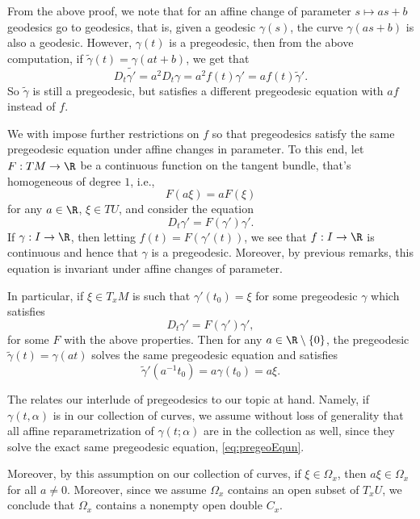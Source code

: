 From the above proof, we note that for an affine change of parameter $s\mapsto as+b$ geodesics go to geodesics, that is, given a geodesic $\gamma(s)$, the curve $\gamma(as+b)$ is also a geodesic.  However, $\gamma(t)$ is a pregeodesic, then from the above computation, if $\tilde{\gamma}(t)=\gamma(at+b)$, we get that
$$D_t\tilde{\gamma'}=a^2D_t\gamma=a^2f(t)\gamma'=af(t)\tilde{\gamma}'.$$
So $\tilde{\gamma}$ is still a pregeodesic, but satisfies a different pregeodesic equation with $af$ instead of $f$.  

We with impose further restrictions on $f$ so that pregeodesics satisfy the same pregeodesic equation under affine changes in parameter.  To this end, let $F:TM\to\R$ be a continuous function on the tangent bundle, that's homogeneous of degree $1$, i.e.,
$$F(a\xi)=aF(\xi)$$
for any $a\in\R$, $\xi\in TU$, and consider the equation
\begin{equation}\label{eq:pregeoEqun}
	D_t\gamma'=F(\gamma')\gamma'.
\end{equation}
If $\gamma:I\to\R$, then letting $f(t)=F(\gamma'(t))$, we see that $f:I\to\R$ is continuous and hence that $\gamma$ is a pregeodesic.  Moreover, by previous remarks, this equation is invariant under affine changes of parameter.

In particular, if $\xi\in T_xM$ is such that $\gamma'(t_0)=\xi$ for some pregeodesic $\gamma$ which satisfies
$$D_t\gamma'=F(\gamma')\gamma',$$
for some $F$ with the above properties.  Then for any $a\in\R\setminus\{0\}$, the pregeodesic $\tilde{\gamma}(t)=\gamma(at)$ solves the same pregeodesic equation and satisfies
$$\tilde{\gamma}'(a^{-1}t_0)=a\gamma(t_0)=a\xi.$$

The relates our interlude of pregeodesics to our topic at hand.  Namely, if $\gamma(t,\alpha)$ is in our collection of curves, we assume without loss of generality that all affine reparametrization of $\gamma(t;\alpha)$ are in the collection as well, since they solve the exact same pregeodesic equation, \cref{eq:pregeoEqun}.  

Moreover, by this assumption on our collection of curves, if $\xi\in\Omega_x$, then $a\xi\in\Omega_x$ for all $a\neq0$.  Moreover, since we assume $\Omega_x$ contains an open subset of $T_xU$, we conclude that $\Omega_x$ contains a nonempty open double $C_x$.




